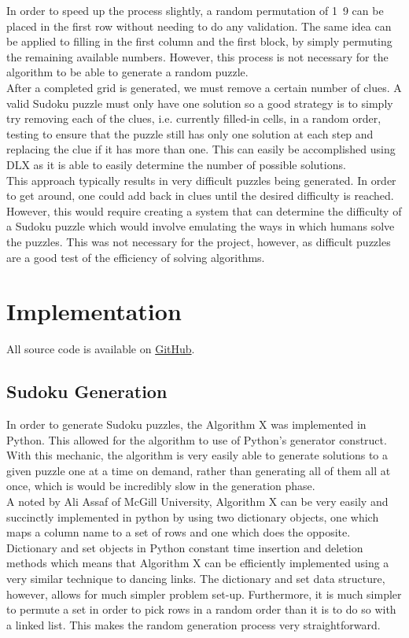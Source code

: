 \documentclass[12pt]{article}
\newcounter{row}
\newcounter{col}
\begin{document}
In order to speed up the process slightly, a random permutation of 1~9 can be placed in the first row without needing to do any validation. The same idea can be applied to filling in the first column and the first block, by simply permuting the remaining available numbers. However, this process is not necessary for the algorithm to be able to generate a random puzzle.\\

After a completed grid is generated, we must remove a certain number of clues. A valid Sudoku puzzle must only have one solution so a good strategy is to simply try removing each of the clues, i.e. currently filled-in cells, in a random order, testing to ensure that the puzzle still has only one solution at each step and replacing the clue if it has more than one. This can easily be accomplished using DLX as it is able to easily determine the number of possible solutions. \\

This approach typically results in very difficult puzzles being generated. In order to get around, one could add back in clues until the desired difficulty is reached. However, this would require creating a system that can determine the difficulty of a Sudoku puzzle which would involve emulating the ways in which humans solve the puzzles. This was not necessary for the project, however, as difficult puzzles are a good test of the efficiency of solving algorithms.

\section{Implementation}
All source code is available on \href{https://github.com/smaskell/Sudoku}{GitHub}.
\subsection{Sudoku Generation}
In order to generate Sudoku puzzles, the Algorithm X was implemented in Python. This allowed for the algorithm to use of Python's generator construct. With this mechanic, the algorithm is very easily able to generate solutions to a given puzzle one at a time on demand, rather than generating all of them all at once, which is would be incredibly slow in the generation phase. \\

A noted by Ali Assaf of McGill University, Algorithm X can be very easily and succinctly implemented in python by using two dictionary objects, one which maps a column name to a set of rows and one which does the opposite. Dictionary and set objects in Python constant time insertion and deletion methods which means that Algorithm X can be efficiently implemented using a very similar technique to dancing links. The dictionary and set data structure, however, allows for much simpler problem set-up. Furthermore, it is much simpler to permute a set in order to pick rows in a random order than it is to do so with a linked list. This makes the random generation process  very straightforward.\\
\end{document}
